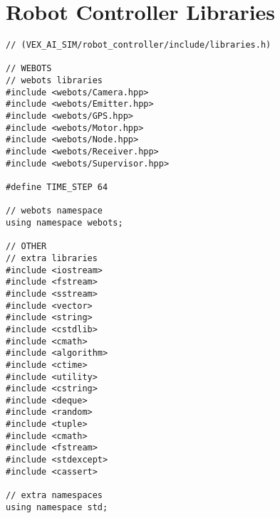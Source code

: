 \appendix
{}
\section*{Robot Controller Libraries}
\begin{verbatim}
// (VEX_AI_SIM/robot_controller/include/libraries.h)

// WEBOTS
// webots libraries
#include <webots/Camera.hpp>
#include <webots/Emitter.hpp>
#include <webots/GPS.hpp>
#include <webots/Motor.hpp>
#include <webots/Node.hpp>
#include <webots/Receiver.hpp>
#include <webots/Supervisor.hpp>

#define TIME_STEP 64

// webots namespace
using namespace webots;

// OTHER
// extra libraries
#include <iostream>
#include <fstream>
#include <sstream>
#include <vector>
#include <string>
#include <cstdlib>
#include <cmath>
#include <algorithm>
#include <ctime>
#include <utility>
#include <cstring>
#include <deque>
#include <random>
#include <tuple>
#include <cmath>
#include <fstream>
#include <stdexcept>
#include <cassert>

// extra namespaces
using namespace std;
\end{verbatim}
